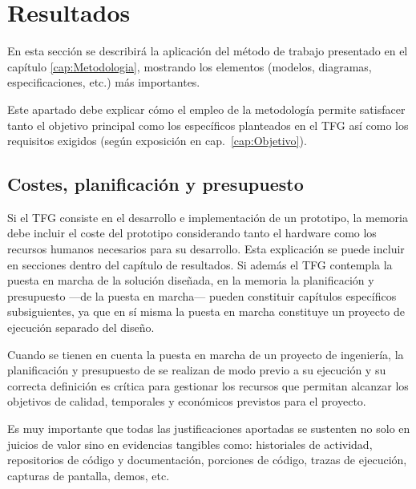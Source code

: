 \chapter{Resultados}
\label{cap:Resultados}

En esta sección se describirá la aplicación del método de trabajo presentado en el capítulo \ref{cap:Metodologia},  mostrando los elementos (modelos, diagramas, especificaciones, etc.) más importantes. 

Este apartado debe explicar cómo el empleo de la metodología permite satisfacer tanto el objetivo principal como los específicos planteados en el TFG así como los requisitos exigidos (según exposición en cap.~\ref{cap:Objetivo}).

\section{Costes, planificación y presupuesto}
Si el TFG consiste en el desarrollo e implementación de un prototipo, la memoria  debe incluir el coste del prototipo considerando tanto el hardware como los recursos humanos necesarios para su desarrollo. Esta explicación se puede incluir en secciones dentro del capítulo de resultados. Si además el TFG contempla la puesta en marcha de la solución diseñada, en la memoria la planificación y presupuesto ---de la puesta en marcha--- pueden constituir capítulos específicos subsiguientes, ya que en sí misma la puesta en marcha constituye un proyecto de ejecución separado del diseño. 

Cuando se tienen en cuenta la puesta en marcha de un proyecto de ingeniería, la planificación y presupuesto de se realizan de modo previo a su ejecución y su correcta definición es crítica para gestionar los recursos que permitan alcanzar los objetivos de calidad, temporales y económicos previstos para el proyecto. 

Es muy importante que todas las justificaciones aportadas se sustenten no solo en juicios de valor sino en evidencias tangibles como: historiales de actividad, repositorios de código y documentación, porciones de código, trazas de ejecución, capturas de pantalla, demos, etc.
